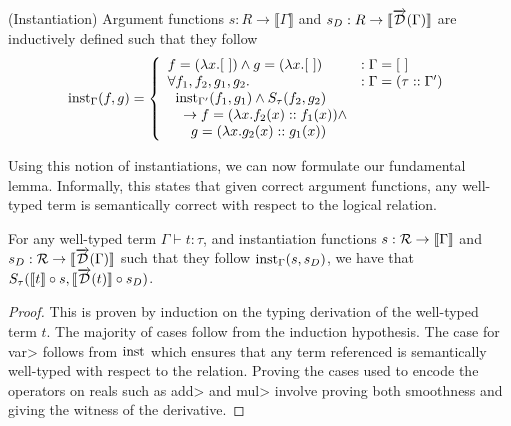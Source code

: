   \begin{definition}(Instantiation)
    Argument functions $s : R \rightarrow \llbracket \Gamma \rrbracket$ and $s_D : R \rightarrow \llbracket \overrightarrow{\mathcal{D}}(\Gamma) \rrbracket$ are inductively defined such that they follow
    \begin{equation}
      \text{inst}_{\Gamma}(f, g) =
        \left\{
          \begin{array}{ll}
            f = (\lambda x. [\ ]) \wedge g = (\lambda x. [\ ])
              & : \Gamma = [\ ] \\
            \forall f_1, f_2, g_1, g_2.
              & : \Gamma = (\tau :: \Gamma') \\
              \;\;\text{inst}_{\Gamma'}(f_1, g_1) \wedge S_\tau(f_2, g_2) \\
              \;\;\;\; \to f = (\lambda x. f_2(x) :: f_1(x)) \wedge \\
              \;\;\;\;\;\; g = (\lambda x. g_2(x) :: g_1(x))
          \end{array}
        \right.
    \label{eqn:inst_base}
    \end{equation}
  \end{definition}

  Using this notion of instantiations, we can now formulate our fundamental lemma. Informally, this states that given correct argument functions, any well-typed term is semantically correct with respect to the logical relation.
  \begin{lemma}\label{thm:fundamental_lemma}
    For any well-typed term $\Gamma \vdash t : \tau$, and instantiation functions $s : \mathcal{R} \rightarrow \llbracket \Gamma \rrbracket$ and $s_D : \mathcal{R} \rightarrow \llbracket \overrightarrow{\mathcal{D}}(\Gamma) \rrbracket$ such that they follow $\text{inst}_{\Gamma}(s, s_D)$, we have that $S_\tau(\llbracket t\rrbracket \circ s, \llbracket \overrightarrow{\mathcal{D}}(t)\rrbracket \circ s_D)$.
  \end{lemma}


  \begin{proof}
    This is proven by induction on the typing derivation of the well-typed term $t$. The majority of cases follow from the induction hypothesis.
    The case for \<var> follows from $\text{inst}_{}$ which ensures that any term referenced is semantically well-typed with respect to the relation.
    Proving the cases used to encode the operators on reals such as \<add> and \<mul> involve proving both smoothness and giving the witness of the derivative.
  \end{proof}

